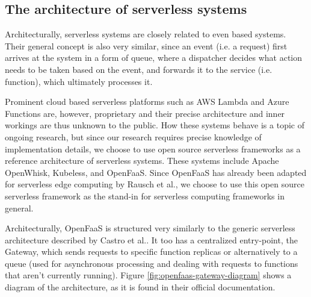 \subsection{The architecture of serverless systems}
Architecturally, serverless systems are closely related to even based systems.
Their general concept is also very similar, since an event (i.e. a request) first arrives at the system in a form of queue, where a dispatcher decides what action needs to be taken based on the event, and forwards it to the service (i.e. function), which ultimately processes it\cite{castroServerDeadLong2019}.

Prominent cloud based serverless platforms such as AWS Lambda\cite{aws-lambda} and Azure Functions\cite{azure-functions} are, however, proprietary and their precise architecture and inner workings are thus unknown to the public.
How these systems behave is a topic of ongoing research\cite{wangPeekingCurtainsServerless2018}, but since our research requires precise knowledge of implementation details, we choose to use open source serverless frameworks as a reference architecture of serverless systems.
These systems include Apache OpenWhisk\cite{openwhisk}, Kubeless\cite{kubeless}, and OpenFaaS\cite{openfaas}.
Since OpenFaaS has already been adapted for serverless edge computing by Rausch et al.\cite{rauschServerlessPlatformEdge}, we choose to use this open source serverless framework as the stand-in for serverless computing frameworks in general.

Architecturally, OpenFaaS is structured very similarly to the generic serverless architecture described by Castro et al.\cite{castroServerDeadLong2019}.
It too has a centralized entry-point, the Gateway, which sends requests to specific function replicas or alternatively to a queue (used for asynchronous processing and dealing with requests to functions that aren't currently running).
Figure \ref{fig:openfaas-gateway-diagram} shows a diagram of the architecture, as it is found in their official documentation\cite{openfaas-gateway}.

